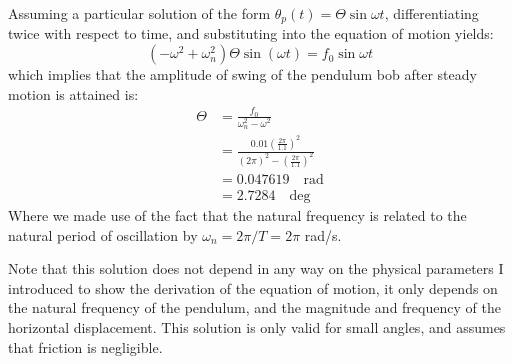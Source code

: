 \documentclass[letter, 11pt]{article}
\begin{document}
Assuming a particular solution of the form $\theta_p(t) =
\Theta\sin\omega t$, differentiating twice with respect
to time, and substituting into the equation of motion yields:
\[
(-\omega^2 + \omega_n^2)\Theta \sin\left(\omega t \right) = f_0 \sin
\omega t
\]
which implies that the amplitude of swing of the pendulum bob after steady
motion is attained is:
\begin{align*}
  \Theta &= \frac{f_0}{\omega_n^2 - \omega^2} \\
         &= \frac{0.01\left(\frac{2\pi}{1.1}\right)^2}{(2\pi)^2 -
         (\frac{2\pi}{1.1})^2} \\
         &= 0.047619 \quad \text{rad}\\
         &= 2.7284 \quad \text{deg}
\end{align*}
Where we made use of the fact that the natural frequency is related to the
natural period of oscillation by $\omega_n = 2\pi / T = 2\pi$ rad/s.

Note that this solution does not depend in any way on the physical parameters I
introduced to show the derivation of the equation of motion, it only depends on
the natural frequency of the pendulum, and the magnitude and frequency of the
horizontal displacement. This solution is only valid for small angles, and
assumes that friction is negligible.
\end{document}
